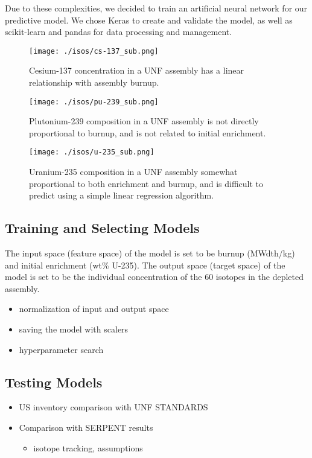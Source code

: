 Due to these complexities, we decided to train an artificial
neural network for our predictive model. We chose
Keras to create and validate the model, as well as scikit-learn
and pandas for data processing and management.

\begin{figure}
    \centering
    \texttt{[image: ./isos/cs-137\_sub.png]}
    \caption{Cesium-137 concentration in a \gls{UNF} assembly
             has a linear relationship with assembly burnup.}
    \label{fig:cs_137}
\end{figure}


\begin{figure}
    \centering
    \texttt{[image: ./isos/pu-239\_sub.png]}
    \caption{Plutonium-239 composition in a \gls{UNF} assembly
             is not directly proportional to burnup, and is
             not related to initial enrichment.}
    \label{fig:pu_239}
\end{figure}
\begin{figure}
    \centering
    \texttt{[image: ./isos/u-235\_sub.png]}
    \caption{Uranium-235 composition in a \gls{UNF} assembly
             somewhat proportional to both enrichment and
             burnup, and is difficult to predict using
             a simple linear regression algorithm.}
    \label{fig:u_235}
\end{figure}


\subsection{Training and Selecting Models}

The input space (feature space) of the model is set to
be burnup (MWdth/kg) and initial enrichment (wt\% U-235).
The output space (target space) of the model is set to
be the individual concentration of the 60 isotopes in the
depleted assembly.




\begin{itemize}
    Training model
    \begin{itemize}
        \item Describe data - feature and target space, number, std deviation etc
        \item Training data curation
    \end{itemize}
    \item normalization of input and output space
    \item saving the model with scalers
    \item hyperparameter search
\end{itemize}






\subsection{Testing Models}
\begin{itemize}
    \item US inventory comparison with UNF STANDARDS
    \item Comparison with SERPENT results
    \begin{itemize}
        \item isotope tracking, assumptions
    \end{itemize}
\end{itemize}
